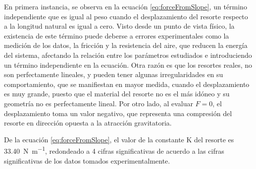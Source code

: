 \documentclass[../main.tex]{subfiles}
\begin{document}
En primera instancia, se observa en la ecuación \ref{eq:forceFromSlope}, un término independiente que es igual al peso cuando el desplazamiento del resorte respecto a la longitud natural es igual a cero.
Visto desde un punto de vista físico, la existencia de este término puede deberse a errores experimentales como la medición de los datos, la fricción y la resistencia del aire, que reducen la energía del sistema, afectando la relación entre los parámetros estudiados e introduciendo un término independiente en la ecuación.
Otra razón es que los resortes reales, no son perfectamente lineales, y pueden tener algunas irregularidades en su comportamiento, que se manifiestan en mayor medida, cuando el desplazamiento es muy grande, puesto que el material del resorte no es el más idóneo y su geometría no es perfectamente lineal.
Por otro lado, al evaluar $F = 0$, el desplazamiento toma un valor negativo, que representa una compresión del resorte en dirección opuesta a la atracción gravitatoria.

De la ecuación \ref{eq:forceFromSlope}, el valor de la constante K del resorte es \qty{33.40}{\newton\per\metre}, redondeado a 4 cifras significativas de acuerdo a las cifras significativas de los datos tomados experimentalmente.
\end{document}
